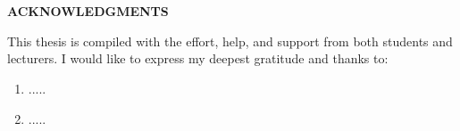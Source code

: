 \chapter*{}
\vspace*{-1.0cm}
\begin{center}
\normalfont\LARGE\textbf{ACKNOWLEDGMENTS}
\end{center}
\par This thesis is compiled with the effort, help, and support from both students and lecturers. I would like to express my deepest gratitude and thanks to:
\begin{enumerate}
\item .....
\item .....
\end{enumerate}
